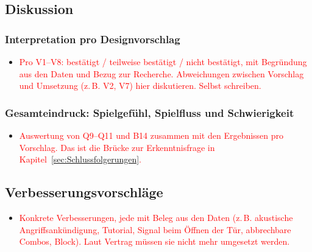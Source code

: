 \documentclass[../Main.tex]{subfiles}
\begin{document}
\subsection{Diskussion}

\subsubsection{Interpretation pro Designvorschlag} \label{sec:Interpretation}

\begin{itemize}[leftmargin=1.5cm]
    \item \textcolor{red}{Pro V1--V8: bestätigt / teilweise bestätigt / nicht bestätigt, mit Begründung aus den Daten und Bezug zur Recherche. Abweichungen zwischen Vorschlag und Umsetzung (z.\,B. V2, V7) hier diskutieren. Selbst schreiben.}
\end{itemize}

\subsubsection{Gesamteindruck: Spielgefühl, Spielfluss und Schwierigkeit} \label{sec:Gesamteindruck}

\begin{itemize}[leftmargin=1.5cm]
    \item \textcolor{red}{Auswertung von Q9--Q11 und B14 zusammen mit den Ergebnissen pro Vorschlag. Das ist die Brücke zur Erkenntnisfrage in Kapitel~\ref{sec:Schlussfolgerungen}.}
\end{itemize}

\subsection{Verbesserungsvorschläge} \label{sec:Verbesserungen}

\begin{itemize}[leftmargin=1.5cm]
    \item \textcolor{red}{Konkrete Verbesserungen, jede mit Beleg aus den Daten (z.\,B. akustische Angriffsankündigung, Tutorial, Signal beim Öffnen der Tür, abbrechbare Combos, Block). Laut Vertrag müssen sie nicht mehr umgesetzt werden.}
\end{itemize}
\end{document}

